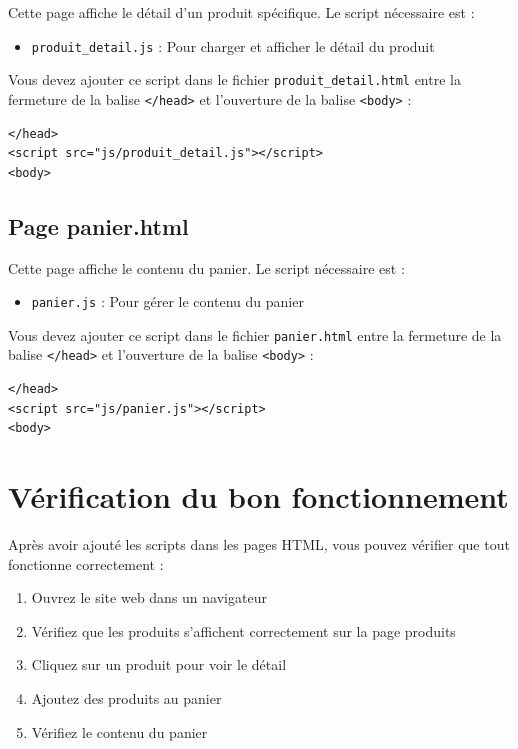 \documentclass[11pt]{article}
\begin{document}
Cette page affiche le détail d'un produit spécifique. Le script nécessaire est :

\begin{itemize}
\item \texttt{produit\_detail.js} : Pour charger et afficher le détail du produit
\end{itemize}

Vous devez ajouter ce script dans le fichier \texttt{produit\_detail.html} entre la fermeture de la balise \texttt{</head>} et l'ouverture de la balise \texttt{<body>} :

\begin{verbatim}
</head>
<script src="js/produit_detail.js"></script>
<body>
\end{verbatim}

\subsection{Page panier.html}

Cette page affiche le contenu du panier. Le script nécessaire est :

\begin{itemize}
\item \texttt{panier.js} : Pour gérer le contenu du panier
\end{itemize}

Vous devez ajouter ce script dans le fichier \texttt{panier.html} entre la fermeture de la balise \texttt{</head>} et l'ouverture de la balise \texttt{<body>} :

\begin{verbatim}
</head>
<script src="js/panier.js"></script>
<body>
\end{verbatim}

\section{Vérification du bon fonctionnement}

Après avoir ajouté les scripts dans les pages HTML, vous pouvez vérifier que tout fonctionne correctement :

\begin{enumerate}
\item Ouvrez le site web dans un navigateur
\item Vérifiez que les produits s'affichent correctement sur la page produits
\item Cliquez sur un produit pour voir le détail
\item Ajoutez des produits au panier
\item Vérifiez le contenu du panier
\end{enumerate}
\end{document}
